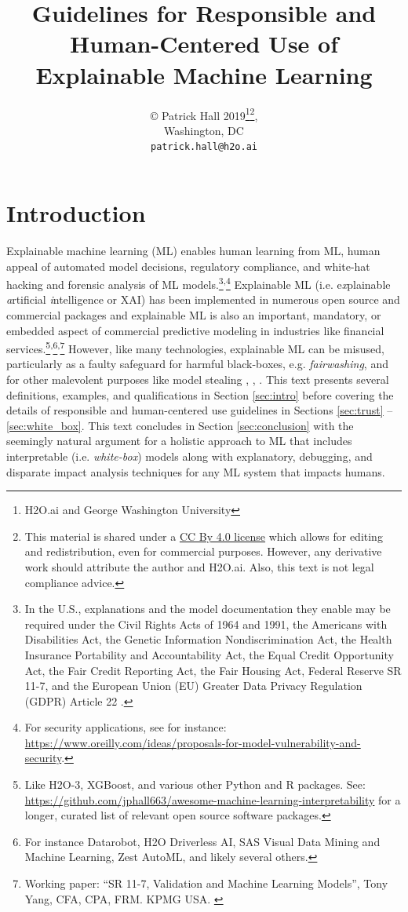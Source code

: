 \documentclass[fleqn]{article}
\title{Guidelines for Responsible and Human-Centered Use of Explainable Machine Learning}
\author{
  \copyright \hspace{1pt} Patrick Hall 2019\footnote{H2O.ai and George Washington University}\hspace{4pt}\footnote{This material is shared under a \href{https://creativecommons.org/licenses/by/4.0/deed.ast}{CC By 4.0 license} which allows for editing and redistribution, even for commercial purposes. However, any derivative work should attribute the author and H2O.ai. Also, this text is not legal compliance advice.}\hspace{4pt},\\
  Washington, DC\\
  \texttt{patrick.hall@h2o.ai}
}
\begin{document}
\maketitle

\section{Introduction}

Explainable machine learning (ML) enables human learning from ML, human appeal of automated model decisions, regulatory compliance, and white-hat hacking and forensic analysis of ML models.\footnote{In the U.S., explanations and the model documentation they enable may be required under the Civil Rights Acts of 1964 and 1991, the Americans with Disabilities Act, the Genetic Information Nondiscrimination Act, the Health Insurance Portability and Accountability Act, the Equal Credit Opportunity Act, the Fair Credit Reporting Act, the Fair Housing Act, Federal Reserve SR 11-7, and the European Union (EU) Greater Data Privacy Regulation (GDPR) Article 22 \cite{ff_interpretability}.}\textsuperscript{,}\footnote{For security applications, see for instance: \url{https://www.oreilly.com/ideas/proposals-for-model-vulnerability-and-security}.\label{fn:regs}} Explainable ML (i.e. e\textit{x}plainable \textit{a}rtificial \textit{i}ntelligence or XAI) has been implemented in numerous open source and commercial packages and explainable ML is also an important, mandatory, or embedded aspect of commercial predictive modeling in industries like financial services.\footnote{Like H2O-3, XGBoost, and various other Python and R packages. See: \url{https://github.com/jphall663/awesome-machine-learning-interpretability} for a longer, curated list of relevant open source software packages.}\textsuperscript{,}\footnote{For instance  Datarobot, H2O Driverless AI, SAS Visual Data Mining and Machine Learning, Zest AutoML, and likely several others.}\textsuperscript{,}\footnote{Working paper: ``SR 11-7, Validation and Machine Learning Models'', Tony Yang, CFA, CPA, FRM. KPMG USA. \label{fn:yang}} However, like many technologies, explainable ML can be misused, particularly as a faulty safeguard for harmful black-boxes, e.g. \textit{fairwashing}, and for other malevolent purposes like model stealing \cite{fair_washing}, \cite{please_stop}, \cite{model_stealing}. This text presents several definitions, examples, and qualifications in Section \ref{sec:intro} before covering the details of responsible and human-centered use guidelines in Sections \ref{sec:trust} -- \ref{sec:white_box}. This text concludes in Section \ref{sec:conclusion} with the seemingly natural argument for a holistic approach to ML that includes interpretable (i.e. \textit{white-box}) models along with explanatory, debugging, and disparate impact analysis techniques for any ML system that impacts humans. 
\end{document}
